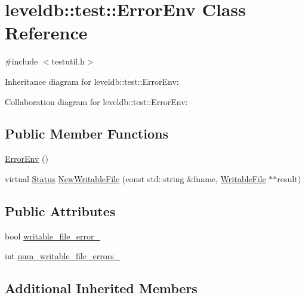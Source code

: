 \hypertarget{classleveldb_1_1test_1_1_error_env}{\section{leveldb\-:\-:test\-:\-:Error\-Env Class Reference}
\label{classleveldb_1_1test_1_1_error_env}
}


{\ttfamily \#include $<$testutil.\-h$>$}



Inheritance diagram for leveldb\-:\-:test\-:\-:Error\-Env\-:


Collaboration diagram for leveldb\-:\-:test\-:\-:Error\-Env\-:
\subsection*{Public Member Functions}
\begin{DoxyCompactItemize}
\item 
\hyperlink{classleveldb_1_1test_1_1_error_env_aa9d0985b519b252aec24cca8fe89c8b7}{Error\-Env} ()
\item 
virtual \hyperlink{classleveldb_1_1_status}{Status} \hyperlink{classleveldb_1_1test_1_1_error_env_a2990be71c7fb9473bd1fa0f8da8fd078}{New\-Writable\-File} (const std\-::string \&fname, \hyperlink{classleveldb_1_1_writable_file}{Writable\-File} $\ast$$\ast$result)
\end{DoxyCompactItemize}
\subsection*{Public Attributes}
\begin{DoxyCompactItemize}
\item 
bool \hyperlink{classleveldb_1_1test_1_1_error_env_ae3593b752dff671f24f3637376e1cf22}{writable\-\_\-file\-\_\-error\-\_\-}
\item 
int \hyperlink{classleveldb_1_1test_1_1_error_env_afa4564355d86107c8ed0d6efe53eadef}{num\-\_\-writable\-\_\-file\-\_\-errors\-\_\-}
\end{DoxyCompactItemize}
\subsection*{Additional Inherited Members}


